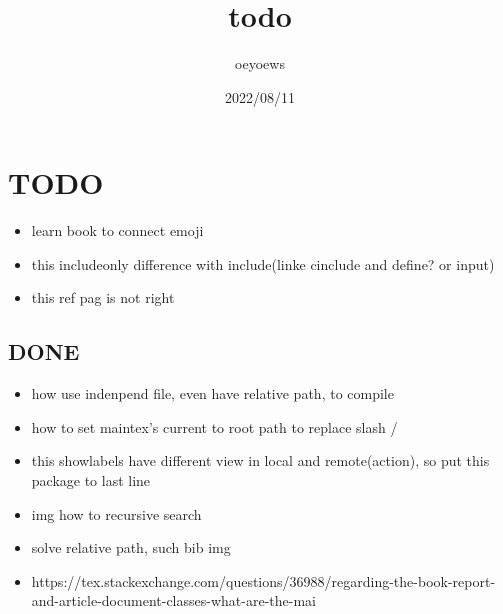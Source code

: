 \documentclass[UTF8]{article}
\title{todo \emoji{check-mark-button}}
\author{oeyoews}
\date{2022/08/11}
\begin{document}
\maketitle

\section{ TODO }%
\label{sec:TODO}

\begin{itemize}
	\item learn book to connect emoji
	\item this includeonly difference with include(linke cinclude and define? or
	      input)
	\item this ref pag is not right
\end{itemize}

\subsection{ DONE}%
\label{sec:DONE}

\begin{itemize}
	\item how use indenpend file, even have relative path, to compile
	\item how to set maintex's current to root path to replace slash /
	\item this showlabels have different view in local and remote(action), so put
	      this package to last line
	\item img how to recursive search
	\item solve relative path, such bib img
	\item https://tex.stackexchange.com/questions/36988/regarding-the-book-report-and-article-document-classes-what-are-the-mai
\end{itemize}
\end{document}
